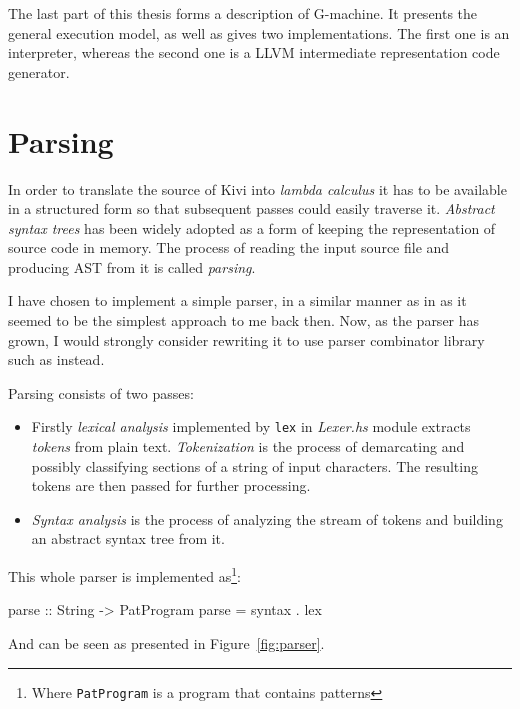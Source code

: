 \documentclass[12pt,a4paper]{report}
\begin{document}
The last part of this thesis forms a description of G-machine. It presents the
general execution model, as well as gives two implementations. The first one is
an interpreter, whereas the second one is a LLVM intermediate representation
code generator.

\chapter{Parsing}

In order to translate the source of Kivi into \textit{lambda calculus} it has
to be available in a structured form so that subsequent passes could easily
traverse it. \textit{Abstract syntax trees}\cite{ALSU07} has been widely
adopted as a form of keeping the representation of source code in memory. The
process of reading the input source file and producing AST from it is called
\textit{parsing}.

I have chosen to implement a simple parser, in a similar manner as in
\cite{JonLes00} as it seemed to be the simplest approach to me back then. Now, as
the parser has grown, I would strongly consider rewriting it to use parser
combinator library such as \cite{website:parsec} instead.

Parsing consists of two passes:

\begin{itemize}
  \item Firstly \textit{lexical analysis} implemented by \texttt{lex} in
    \textit{Lexer.hs} module extracts \textit{tokens} from plain text.
    \textit{Tokenization} is the process of demarcating and possibly
    classifying sections of a string of input characters. The resulting tokens
    are then passed for further processing.
  \item \textit{Syntax analysis} is the process of analyzing the stream of
    tokens and building an abstract syntax tree from it.
\end{itemize}

This whole parser is implemented as\footnote{Where \texttt{PatProgram} is a
program that contains patterns}:

\vspace*{0.2in}
\begin{code}[style=haskell]
  parse :: String -> PatProgram
  parse = syntax . lex
\end{code}

And can be seen as presented in Figure~\ref{fig:parser}.
\end{document}
